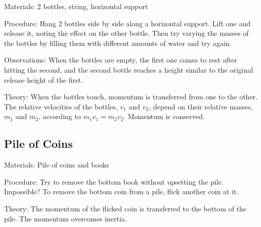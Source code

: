 \begin{multicols}{2}
\begin{description*}
\item[Materials:]{2 bottles, string, horizontal support}
\item[Procedure:]{Hang 2 bottles side by side along a horizontal support. Lift one and release it, noting the effect on the other bottle. Then try varying the masses of the bottles by filling them with different amounts of water and try again.}
\item[Observations:]{When the bottles are empty, the first one comes to rest after hitting the second, and the second bottle reaches a height similar to the original release height of the first.}
\item[Theory:]{When the bottles touch, momentum is transferred from one to the other. The relative velocities of the bottles, $v_1$ and $v_2$, depend on their relative masses, $m_1$ and $m_2$, according to $m_1v_1 = m_2v_2$. Momentum is conserved.}
\end{description*}

\subsection{Pile of Coins}


\begin{description*}
\item[Materials:]{Pile of coins and books}
\item[Procedure:]{Try to remove the bottom book without upsetting the pile. Impossible? To remove the bottom coin from a pile, flick another coin at it.}
\item[Theory:]{The momentum of the flicked coin is transferred to the bottom of the pile. The momentum overcomes inertia.}
\end{description*}


\end{multicols}
